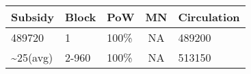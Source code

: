\documentclass[11pt,a4paperpaper,]{report}
\begin{document}
\begin{longtable}[]{@{}lllcl@{}}
\toprule
\begin{minipage}[b]{0.16\columnwidth}\raggedright\strut
Subsidy\strut
\end{minipage} & \begin{minipage}[b]{0.19\columnwidth}\raggedright\strut
Block\strut
\end{minipage} & \begin{minipage}[b]{0.10\columnwidth}\raggedright\strut
PoW\strut
\end{minipage} & \begin{minipage}[b]{0.10\columnwidth}\centering\strut
MN\strut
\end{minipage} & \begin{minipage}[b]{0.16\columnwidth}\raggedright\strut
Circulation\strut
\end{minipage}\tabularnewline
\midrule
\endhead
\begin{minipage}[t]{0.16\columnwidth}\raggedright\strut
489720\strut
\end{minipage} & \begin{minipage}[t]{0.19\columnwidth}\raggedright\strut
1\strut
\end{minipage} & \begin{minipage}[t]{0.10\columnwidth}\raggedright\strut
100\%\strut
\end{minipage} & \begin{minipage}[t]{0.10\columnwidth}\centering\strut
NA\strut
\end{minipage} & \begin{minipage}[t]{0.16\columnwidth}\raggedright\strut
489200\strut
\end{minipage}\tabularnewline
\begin{minipage}[t]{0.16\columnwidth}\raggedright\strut
\textasciitilde{}25(avg)\strut
\end{minipage} & \begin{minipage}[t]{0.19\columnwidth}\raggedright\strut
2-960\strut
\end{minipage} & \begin{minipage}[t]{0.10\columnwidth}\raggedright\strut
100\%\strut
\end{minipage} & \begin{minipage}[t]{0.10\columnwidth}\centering\strut
NA\strut
\end{minipage} & \begin{minipage}[t]{0.16\columnwidth}\raggedright\strut
513150\strut
\end{minipage}\tabularnewline

\end{longtable}
\end{document}
